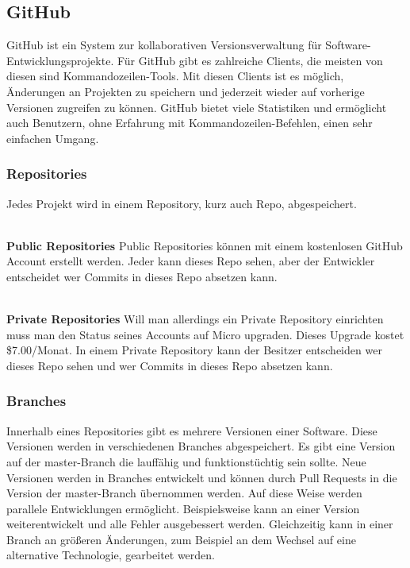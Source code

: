 \documentclass[FIPLY_base.tex]{subfiles}
\begin{document}
\subsection{GitHub}
GitHub ist ein System zur kollaborativen Versionsverwaltung für Software-Entwicklungsprojekte.
Für GitHub gibt es zahlreiche Clients, die meisten von diesen sind Kommandozeilen-Tools.
Mit diesen Clients ist es möglich, Änderungen an Projekten zu speichern und jederzeit wieder auf vorherige Versionen zugreifen zu können.
GitHub bietet viele Statistiken und ermöglicht auch Benutzern, ohne Erfahrung mit Kommandozeilen-Befehlen, einen sehr einfachen Umgang. 

\subsubsection{Repositories}
Jedes Projekt wird in einem Repository, kurz auch Repo, abgespeichert.

\ \\
\textbf{Public Repositories}
Public Repositories können mit einem kostenlosen GitHub Account erstellt werden.
Jeder kann dieses Repo sehen, aber der Entwickler entscheidet wer Commits in dieses Repo absetzen kann.

\ \\
\textbf{Private Repositories}
Will man allerdings ein Private Repository einrichten muss man den Status seines Accounts auf Micro upgraden.
Dieses Upgrade kostet \$7.00/Monat. In einem Private Repository kann der Besitzer entscheiden wer dieses Repo sehen und wer Commits in dieses Repo absetzen kann.

\subsubsection{Branches}
Innerhalb eines Repositories gibt es mehrere Versionen einer Software. Diese Versionen werden in verschiedenen Branches abgespeichert.
Es gibt eine Version auf der master-Branch die lauffähig und funktionstüchtig sein sollte.
Neue Versionen werden in Branches entwickelt und können durch Pull Requests in die Version der master-Branch übernommen werden. 
Auf diese Weise werden parallele Entwicklungen ermöglicht. Beispielsweise kann an einer Version weiterentwickelt und alle Fehler ausgebessert werden.
Gleichzeitig kann in einer Branch an größeren Änderungen, zum Beispiel an dem Wechsel auf eine alternative Technologie, gearbeitet werden.
\end{document}
